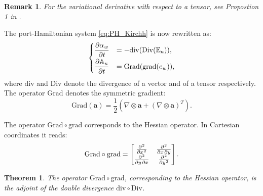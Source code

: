 \documentclass[preprint,12pt]{elsarticle}
\newtheorem{theorem}{Theorem}
\newtheorem{remark}{Remark}
\begin{document}
\begin{remark}
For the variational derivative with respect to a tensor, see Propostion 1 in \cite{BrugnoliMin}.
\end{remark}
The port-Hamiltonian system {\eqref{eq:PH_Kirchh} is now rewritten as:}
\begin{equation}
\label{eq:PH_sys_Kir_Ten_pr}
\begin{cases}
\displaystyle\diffp{\alpha_w}{t} &= - \mathrm{div}(\mathrm{Div}(\mathbb{E}_{\kappa})), \vspace{1mm} \\
\displaystyle\diffp{\mathbb{A}_{\kappa}}{t} &= \mathrm{Grad}(\mathrm{grad}(e_w)),
\end{cases}
\end{equation}
where $\mathrm{div}$ and $\mathrm{Div}$ denote the divergence of a vector and of a tensor respectively. The operator $\mathrm{Grad}$ denotes the symmetric gradient:
\begin{equation}
\mathrm{Grad}(\bm{a}) =  \frac{1}{2} \left(\nabla \otimes \bm{a} + \left(\nabla \otimes \bm{a}\right)^T \right).
\end{equation}

The operator $\mathrm{Grad} \circ \mathrm{grad}$ corresponds to the Hessian operator. In Cartesian coordinates it reads:
\begin{equation}
\mathrm{Grad} \circ \mathrm{grad} = 
\begin{bmatrix}
\diffp[2]{}{x}  &  \diffp{}{x,y} \\
\diffp{}{y,x}   &  \diffp[2]{}{y} \\
\end{bmatrix}.
\end{equation}

\begin{theorem}
The operator $\mathrm{Grad} \circ \mathrm{grad}$, corresponding to the Hessian operator, is the adjoint of the double divergence $\mathrm{div} \circ \mathrm{Div}$.
\end{theorem}
\end{document}
